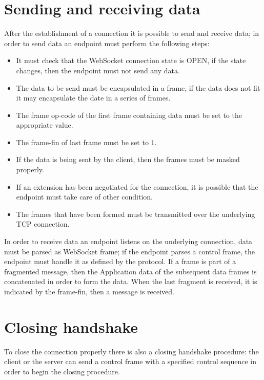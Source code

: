 \section{Sending and receiving data}
After the establishment of a connection it is possible to send and receive data; in order to send data an endpoint must perform the following steps:
\begin{itemize}
	\item It must check that the WebSocket connection state is OPEN, if the state changes, then the endpoint must not send any data.
	\item The data to be send must be encapsulated in a frame, if the data does not fit it may encapsulate the date in a series of frames.
	\item The frame op-code of the first frame containing data must be set to the appropriate value.
	\item The frame-fin of last frame must be set to 1.
	\item If the data is being sent by the client, then the frames must be masked properly.
	\item If an extension has been negotiated for the connection, it is possible that the endpoint must take care of other condition.
	\item The frames that have been formed must be transmitted over the underlying TCP connection.
\end{itemize}

In order to receive data an endpoint listens on the underlying connection, data must be parsed as WebSocket frame;
if the endpoint parses a control frame, the endpoint must handle it as defined by the protocol.\newline
If a frame is part of a fragmented message, then the Application data of the subsequent data frames is concatenated in order to form the data.\newline
When the last fragment is received, it is indicated by the frame-fin, then a message is received.\newline

\section{Closing handshake}
To close the connection properly there is also a closing handshake procedure: the client or
the server can send a control frame with a specified control sequence in order to begin the closing procedure.\newline

